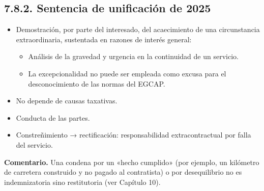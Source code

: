 \subsection{7.8.2. Sentencia de unificación de 2025}
\begin{itemize}
\item Demostración, por parte del interesado, del acaecimiento de una circunstancia extraordinaria, sustentada en razones de interés general:
\begin{itemize}
\item Análisis de la gravedad y urgencia en la continuidad de un servicio.
\item La excepcionalidad no puede ser empleada como excusa para el desconocimiento de las normas del EGCAP.
\end{itemize}
\item No depende de causas taxativas.
\item Conducta de las partes.
\item Constreñimiento → rectificación: responsabilidad extracontractual por falla del servicio.
\end{itemize}
\begin{comentario}
\textcolor[HTML]{8A6D3B}{\textbf{Comentario. }}Una condena por un «hecho cumplido» (por ejemplo, un kilómetro de carretera construido y no pagado al contratista) o por desequilibrio no es indemnizatoria sino restitutoria (ver Capítulo 10).
\end{comentario}
